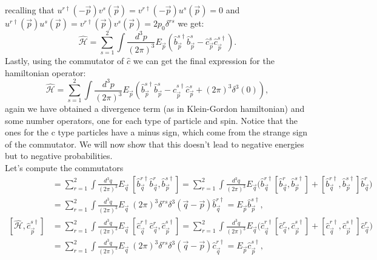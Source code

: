recalling that $u^{r\dagger}(-\vec p)v^s(\vec p)=v^{r\dagger}(-\vec p)u^s(\vec p)=0$ and $u^{r\dagger}(\vec p)u^s(\vec p)=v^{r\dagger}(\vec p)v^s(\vec p)=2p_0\delta^{rs}$ we get:
\begin{equation*}
    \hat{\mathcal{H} }=\sum_{s=1}^{2}\int\frac{d^3p}{(2\pi)^3}E_{\vec p}(\hat{b}^{s\dagger}_{\vec p}\hat{b}^{s}_{\vec p}-\hat{c}^{s}_{\vec p}\hat{c}^{s\dagger}_{\vec p}).
\end{equation*}
Lastly, using the commutator of $\hat{c}$ we can get the final expression for the hamiltonian operator:
\begin{equation*}
    \hat{\mathcal{H} }=\sum_{s=1}^{2}\int\frac{d^3p}{(2\pi)^3}E_{\vec p}(\hat{b}^{s\dagger}_{\vec p}\hat{b}^{s}_{\vec p}-\hat{c}^{s\dagger}_{\vec p}\hat{c}^{s}_{\vec p}+(2\pi)^3\delta^3(0)),
\end{equation*}
again we have obtained a divergence term (as in Klein-Gordon hamiltonian) and some number operators, one for each type of particle and spin. Notice that the ones for the c type particles have a minus sign, which come from the strange sign of the commutator. We will now show that this doesn't lead to negative energies but to negative probabilities.\\Let's compute the commutators
\begin{align*}
    [\hat{\mathcal{H} },\hat{b}^{s\dagger}_{\vec{p}}]&=\sum_{r=1}^{2}\int\frac{d^3q}{(2\pi)^3}E_{\vec q}\ [\hat{b}^{r\dagger}_{\vec q}\hat{b}^{r}_{\vec q},\hat{b}^{s\dagger}_{\vec{p}}]=\sum_{r=1}^{2}\int\frac{d^3q}{(2\pi)^3}E_{\vec q}\bigg(\hat{b}^{r\dagger}_{\vec q}[\hat{b}^{r}_{\vec q},\hat{b}^{s\dagger}_{\vec{p}}]+[\hat{b}^{r\dagger}_{\vec q},\hat{b}^{s\dagger}_{\vec{p}}]\hat{b}^{r}_{\vec q}\bigg)\\&=\sum_{r=1}^{2}\int\frac{d^3q}{(2\pi)^3}E_{\vec q}\ (2\pi)^3\delta^{rs}\delta^{3}(\vec q-\vec p)\hat{b}^{r\dagger}_{\vec q}=E_{\vec p}\hat{b}^{s\dagger}_{\vec p},\\
    [\hat{\mathcal{H} },\hat{c}^{s\dagger}_{\vec{p}}]&=\sum_{r=1}^{2}\int\frac{d^3q}{(2\pi)^3}E_{\vec q}\ [\hat{c}^{r\dagger}_{\vec q}\hat{c}^{r}_{\vec q},\hat{c}^{s\dagger}_{\vec{p}}]=\sum_{r=1}^{2}\int\frac{d^3q}{(2\pi)^3}E_{\vec q}\bigg(\hat{c}^{r\dagger}_{\vec q}[\hat{c}^{r}_{\vec q},\hat{c}^{s\dagger}_{\vec{p}}]+[\hat{c}^{r\dagger}_{\vec q},\hat{c}^{s\dagger}_{\vec{p}}]\hat{c}^{r}_{\vec q}\bigg)\\&=\sum_{r=1}^{2}\int\frac{d^3q}{(2\pi)^3}E_{\vec q}\ (2\pi)^3\delta^{rs}\delta^{3}(\vec q-\vec p)\hat{c}^{r\dagger}_{\vec q}=E_{\vec p}\hat{c}^{s\dagger}_{\vec p},
\end{align*}
